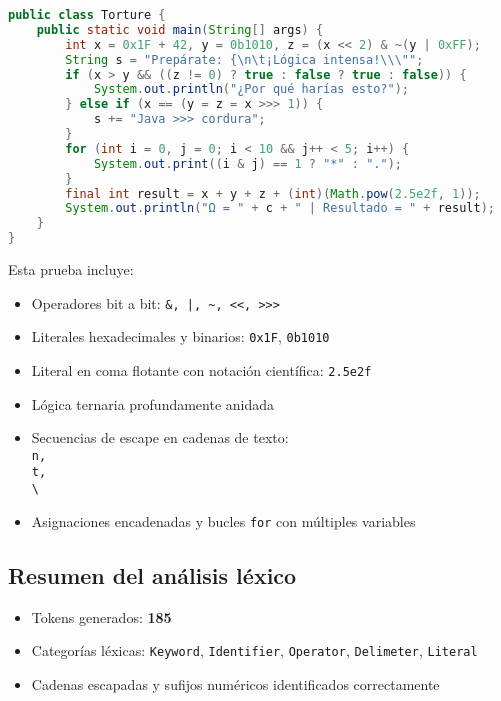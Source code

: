 \documentclass{article}
\begin{document}
\begin{lstlisting}[language=Java, caption=Torture.java - Diseñado para poner a prueba el lexer]
public class Torture {
    public static void main(String[] args) {
        int x = 0x1F + 42, y = 0b1010, z = (x << 2) & ~(y | 0xFF);
        String s = "Prepárate: {\n\t¡Lógica intensa!\\\"";
        if (x > y && ((z != 0) ? true : false ? true : false)) {
            System.out.println("¿Por qué harías esto?");
        } else if (x == (y = z = x >>> 1)) {
            s += "Java >>> cordura";
        }
        for (int i = 0, j = 0; i < 10 && j++ < 5; i++) {
            System.out.print((i & j) == 1 ? "*" : ".");
        }
        final int result = x + y + z + (int)(Math.pow(2.5e2f, 1));
        System.out.println("Ω = " + c + " | Resultado = " + result);
    }
}
\end{lstlisting}

\vspace{0.5em}
\noindent
Esta prueba incluye:
\begin{itemize}
    \item Operadores bit a bit: \texttt{\&, |, \textasciitilde, <<, >>>}
    \item Literales hexadecimales y binarios: \texttt{0x1F}, \texttt{0b1010}
    \item Literal en coma flotante con notación científica: \texttt{2.5e2f}
    \item Lógica ternaria profundamente anidada
    \item Secuencias de escape en cadenas de texto: \texttt{\\n, \\t, \\\textbackslash}
    \item Asignaciones encadenadas y bucles \texttt{for} con múltiples variables
\end{itemize}

\subsection*{Resumen del análisis léxico}
\begin{itemize}
    \item Tokens generados: \textbf{185}
    \item Categorías léxicas: \texttt{Keyword}, \texttt{Identifier}, \texttt{Operator}, \texttt{Delimeter}, \texttt{Literal}
    \item Cadenas escapadas y sufijos numéricos identificados correctamente
\end{itemize}
\end{document}
